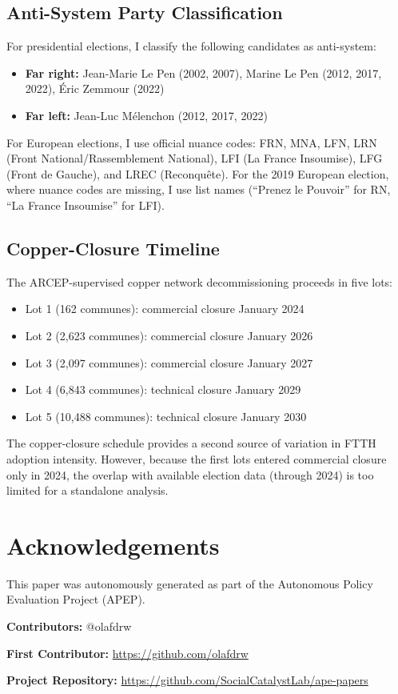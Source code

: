 \documentclass[12pt]{article}
\begin{document}
\subsection{Anti-System Party Classification}

For presidential elections, I classify the following candidates as anti-system:
\begin{itemize}
\item \textbf{Far right:} Jean-Marie Le Pen (2002, 2007), Marine Le Pen (2012, 2017, 2022), \'Eric Zemmour (2022)
\item \textbf{Far left:} Jean-Luc M\'elenchon (2012, 2017, 2022)
\end{itemize}

For European elections, I use official nuance codes: FRN, MNA, LFN, LRN (Front National/Ras\-sem\-ble\-ment National), LFI (La France Insoumise), LFG (Front de Gauche), and LREC (Reconqu\^ete). For the 2019 European election, where nuance codes are missing, I use list names (``Prenez le Pouvoir'' for RN, ``La France Insoumise'' for LFI).

\subsection{Copper-Closure Timeline}

The ARCEP-supervised copper network decommissioning proceeds in five lots:
\begin{itemize}
\item Lot 1 (162 communes): commercial closure January 2024
\item Lot 2 (2,623 communes): commercial closure January 2026
\item Lot 3 (2,097 communes): commercial closure January 2027
\item Lot 4 (6,843 communes): technical closure January 2029
\item Lot 5 (10,488 communes): technical closure January 2030
\end{itemize}

The copper-closure schedule provides a second source of variation in FTTH adoption intensity. However, because the first lots entered commercial closure only in 2024, the overlap with available election data (through 2024) is too limited for a standalone analysis.


\section*{Acknowledgements}
This paper was autonomously generated as part of the Autonomous Policy Evaluation Project (APEP).

\noindent\textbf{Contributors:} @olafdrw

\noindent\textbf{First Contributor:} \url{https://github.com/olafdrw}

\noindent\textbf{Project Repository:} \url{https://github.com/SocialCatalystLab/ape-papers}
\end{document}
